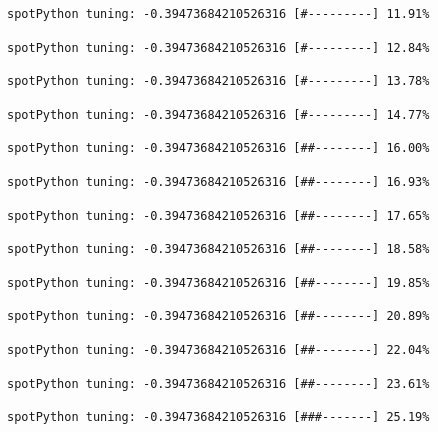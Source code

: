 \documentclass[
  letterpaper,
  DIV=11,
  numbers=noendperiod]{scrreprt}
\begin{document}
\begin{verbatim}
spotPython tuning: -0.39473684210526316 [#---------] 11.91% 
\end{verbatim}

\begin{verbatim}
spotPython tuning: -0.39473684210526316 [#---------] 12.84% 
\end{verbatim}

\begin{verbatim}
spotPython tuning: -0.39473684210526316 [#---------] 13.78% 
\end{verbatim}

\begin{verbatim}
spotPython tuning: -0.39473684210526316 [#---------] 14.77% 
\end{verbatim}

\begin{verbatim}
spotPython tuning: -0.39473684210526316 [##--------] 16.00% 
\end{verbatim}

\begin{verbatim}
spotPython tuning: -0.39473684210526316 [##--------] 16.93% 
\end{verbatim}

\begin{verbatim}
spotPython tuning: -0.39473684210526316 [##--------] 17.65% 
\end{verbatim}

\begin{verbatim}
spotPython tuning: -0.39473684210526316 [##--------] 18.58% 
\end{verbatim}

\begin{verbatim}
spotPython tuning: -0.39473684210526316 [##--------] 19.85% 
\end{verbatim}

\begin{verbatim}
spotPython tuning: -0.39473684210526316 [##--------] 20.89% 
\end{verbatim}

\begin{verbatim}
spotPython tuning: -0.39473684210526316 [##--------] 22.04% 
\end{verbatim}

\begin{verbatim}
spotPython tuning: -0.39473684210526316 [##--------] 23.61% 
\end{verbatim}

\begin{verbatim}
spotPython tuning: -0.39473684210526316 [###-------] 25.19% 
\end{verbatim}
\end{document}
